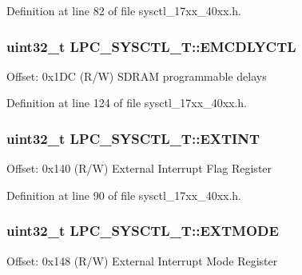 Definition at line 82 of file sysctl\+\_\+17xx\+\_\+40xx.\+h.

\subsubsection[{\texorpdfstring{E\+M\+C\+D\+L\+Y\+C\+TL}{EMCDLYCTL}}]{ uint32\+\_\+t L\+P\+C\+\_\+\+S\+Y\+S\+C\+T\+L\+\_\+\+T\+::\+E\+M\+C\+D\+L\+Y\+C\+TL}\hypertarget{structLPC__SYSCTL__T_a3976afa12c3ebc2e7acfe59aef82acc4}{}\label{structLPC__SYSCTL__T_a3976afa12c3ebc2e7acfe59aef82acc4}
Offset\+: 0x1\+DC (R/W) S\+D\+R\+AM programmable delays 

Definition at line 124 of file sysctl\+\_\+17xx\+\_\+40xx.\+h.

\subsubsection[{\texorpdfstring{E\+X\+T\+I\+NT}{EXTINT}}]{ uint32\+\_\+t L\+P\+C\+\_\+\+S\+Y\+S\+C\+T\+L\+\_\+\+T\+::\+E\+X\+T\+I\+NT}\hypertarget{structLPC__SYSCTL__T_ac394af46f7dc8a036a574980c62ff769}{}\label{structLPC__SYSCTL__T_ac394af46f7dc8a036a574980c62ff769}
Offset\+: 0x140 (R/W) External Interrupt Flag Register 

Definition at line 90 of file sysctl\+\_\+17xx\+\_\+40xx.\+h.

\subsubsection[{\texorpdfstring{E\+X\+T\+M\+O\+DE}{EXTMODE}}]{ uint32\+\_\+t L\+P\+C\+\_\+\+S\+Y\+S\+C\+T\+L\+\_\+\+T\+::\+E\+X\+T\+M\+O\+DE}\hypertarget{structLPC__SYSCTL__T_a22607cf2c4669efe70eae5746f74a33c}{}\label{structLPC__SYSCTL__T_a22607cf2c4669efe70eae5746f74a33c}
Offset\+: 0x148 (R/W) External Interrupt Mode Register 

